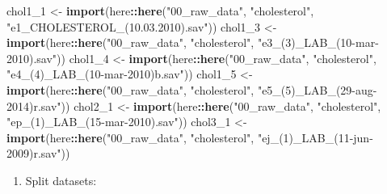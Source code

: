 \documentclass[]{book}
\newenvironment{Shaded}{\begin{snugshade}}{\end{snugshade}}
\newcommand{\DecValTok}[1]{\textcolor[rgb]{0.00,0.00,0.81}{#1}}
\newcommand{\KeywordTok}[1]{\textcolor[rgb]{0.13,0.29,0.53}{\textbf{#1}}}
\newcommand{\NormalTok}[1]{#1}
\newcommand{\OperatorTok}[1]{\textcolor[rgb]{0.81,0.36,0.00}{\textbf{#1}}}
\newcommand{\StringTok}[1]{\textcolor[rgb]{0.31,0.60,0.02}{#1}}
\providecommand{\tightlist}{%
  \setlength{\itemsep}{0pt}\setlength{\parskip}{0pt}}
\begin{document}
\begin{Shaded}
\begin{Highlighting}[]
\NormalTok{chol1_}\DecValTok{1}\NormalTok{ <-}\StringTok{ }\KeywordTok{import}\NormalTok{(here}\OperatorTok{::}\KeywordTok{here}\NormalTok{(}\StringTok{"00_raw_data"}\NormalTok{, }\StringTok{"cholesterol"}\NormalTok{,  }\StringTok{"e1_CHOLESTEROL_(10.03.2010).sav"}\NormalTok{))}
\NormalTok{chol1_}\DecValTok{3}\NormalTok{ <-}\StringTok{ }\KeywordTok{import}\NormalTok{(here}\OperatorTok{::}\KeywordTok{here}\NormalTok{(}\StringTok{"00_raw_data"}\NormalTok{, }\StringTok{"cholesterol"}\NormalTok{,  }\StringTok{"e3_(3)_LAB_(10-mar-2010).sav"}\NormalTok{))}
\NormalTok{chol1_}\DecValTok{4}\NormalTok{ <-}\StringTok{ }\KeywordTok{import}\NormalTok{(here}\OperatorTok{::}\KeywordTok{here}\NormalTok{(}\StringTok{"00_raw_data"}\NormalTok{, }\StringTok{"cholesterol"}\NormalTok{,  }\StringTok{"e4_(4)_LAB_(10-mar-2010)b.sav"}\NormalTok{))}
\NormalTok{chol1_}\DecValTok{5}\NormalTok{ <-}\StringTok{ }\KeywordTok{import}\NormalTok{(here}\OperatorTok{::}\KeywordTok{here}\NormalTok{(}\StringTok{"00_raw_data"}\NormalTok{, }\StringTok{"cholesterol"}\NormalTok{,  }\StringTok{"e5_(5)_LAB_(29-aug-2014)r.sav"}\NormalTok{))}
\NormalTok{chol2_}\DecValTok{1}\NormalTok{ <-}\StringTok{ }\KeywordTok{import}\NormalTok{(here}\OperatorTok{::}\KeywordTok{here}\NormalTok{(}\StringTok{"00_raw_data"}\NormalTok{, }\StringTok{"cholesterol"}\NormalTok{,  }\StringTok{"ep_(1)_LAB_(15-mar-2010).sav"}\NormalTok{))}
\NormalTok{chol3_}\DecValTok{1}\NormalTok{ <-}\StringTok{ }\KeywordTok{import}\NormalTok{(here}\OperatorTok{::}\KeywordTok{here}\NormalTok{(}\StringTok{"00_raw_data"}\NormalTok{, }\StringTok{"cholesterol"}\NormalTok{,  }\StringTok{"ej_(1)_LAB_(11-jun-2009)r.sav"}\NormalTok{))}
\end{Highlighting}
\end{Shaded}

\begin{enumerate}
\def\labelenumi{\arabic{enumi}.}
\setcounter{enumi}{1}
\tightlist
\item
  Split datasets:
\end{enumerate}
\end{document}
